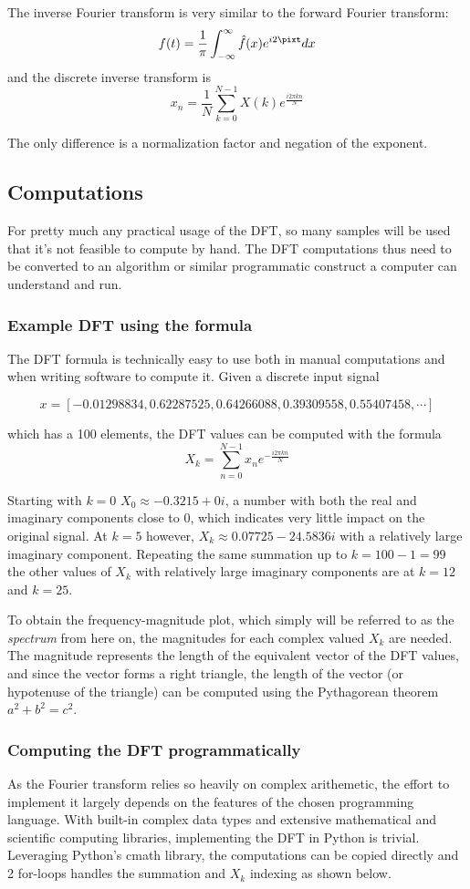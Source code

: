 The inverse Fourier transform is very similar to the forward Fourier transform:
$$ f(t) = \frac{1}{\pi}\int_{-\infty}^{\infty} \hat{f}(x)e^{i2\pixt} dx$$
and the discrete inverse transform is 
$$ x_n = \frac{1}{N}\sum_{k=0}^{N-1} X(k)e^{\frac{i2\pi kn}{N}}$$

The only difference is a normalization factor and negation of the exponent.

\subsection{Computations}
For pretty much any practical usage of the DFT, so many samples will be used that it's not feasible to compute by hand. The DFT computations thus need to be converted to an algorithm or similar programmatic construct a computer can understand and run.

\subsubsection{Example DFT using the formula}
The DFT formula is technically easy to use both in manual computations and when writing software to compute it. Given a discrete input signal 

$$x = [-0.01298834,  0.62287525,  0.64266088,  0.39309558,  0.55407458, \cdots]$$

which has a 100 elements, the DFT values can be computed with the formula $$X_k = \sum_{n=0}^{N-1} x_ne^{-\frac{i2\pi kn}{N}}$$

Starting with $k=0$ $X_0 \approx -0.3215+0i$, a number with both the real and imaginary components close to 0, which indicates very little impact on the original signal. At $k=5$ however, $X_k \approx 0.07725-24.5836i$ with a relatively large imaginary component. Repeating the same summation up to $k=100-1 = 99$ the other values of $X_k$ with relatively large imaginary components are at $k=12$ and $k=25$. 

To obtain the frequency-magnitude plot, which simply will be referred to as the \textit{spectrum} from here on, the magnitudes for each complex valued $X_k$ are needed. The magnitude represents the length of the equivalent vector of the DFT values, and since the vector forms a right triangle, the length of the vector (or hypotenuse of the triangle) can be computed using the Pythagorean theorem $a^2 + b^2 = c^2$. 


\subsubsection{Computing the DFT programmatically}
As the Fourier transform relies so heavily on complex arithemetic, the effort to implement it largely depends on the features of the chosen programming language. With built-in complex data types and extensive mathematical and scientific computing libraries, implementing the DFT in Python is trivial. Leveraging Python's cmath library, the computations can be copied directly and 2 for-loops handles the summation and $X_k$ indexing as shown below.

